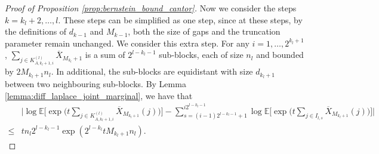 \documentclass[11pt]{article}
\theoremstyle{plain}
\theoremstyle{definition}
\begin{document}
\begin{proof}[Proof of Proposition \ref{prop:bernstein_bound_cantor}]
    Now we consider the steps $k = k_l+2, \dots, l$. These steps can be simplified as one step, since at these steps, by the definitions of $d_{k-1}$ and $M_{k-1}$, both the size of gaps and the truncation parameter remain unchanged. We consider this extra step. For any $i = 1, \dots, 2^{k_l+1}$, $\sum_{j \in K_{A, k_l+1, i}^{(l)}}\overline{X}_{M_{k_l}+1}$ is a sum of $2^{l-k_l-1}$ sub-blocks, each of size $n_l$ and bounded by $2M_{k_l+1}n_l$. In additional, the sub-blocks are equidistant with size $d_{k_l+1}$ between two neighbouring sub-blocks. By Lemma \ref{lemma:diff_laplace_joint_marginal}, we have that
    \begin{equation}\label{eq:together_step_extra}
    \begin{aligned}
        &\Big|\log\mathbb{E}\Big[\exp\Big(t\sum_{j \in K_{A, k_l+1,i}^{(l)}}\overline{X}_{M_{k_l+1}}(j)\Big)\Big] - \sum_{s=(i-1)2^{l-k_l-1}+1}^{i2^{l-k_l-1}}\log\mathbb{E}\Big[\exp\Big( t\sum_{j \in I_{l,s}}\overline{X}_{M_{k_l+1}}(j) \Big)\Big]\Big|\\
        \leq& tn_l2^{l-k_l-1}\exp(2^{l-k_l}tM_{k_l+1}n_l).
    \end{aligned}
    \end{equation}
    

\end{proof}
\end{document}
